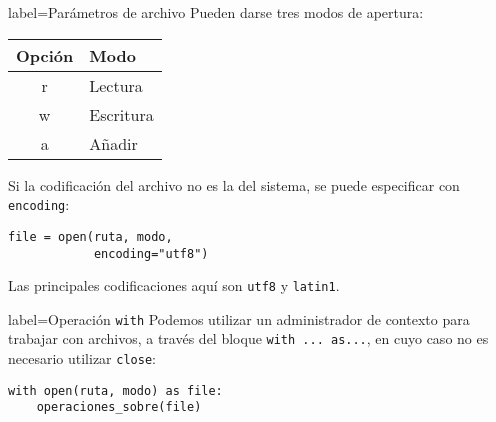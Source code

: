 \begin{contentbox}{label=Parámetros de archivo}
    Pueden darse tres modos de apertura:
    
    \begin{center}
        \begin{tabular}{C|p{0.5\textwidth}}
            \textnormal{Opción} & Modo \\
            \hline
            r & Lectura \\
            w & Escritura \\
            a & Añadir
        \end{tabular}
    \end{center}
    
    Si la codificación del archivo no es la del sistema, se puede especificar con \lstinline!encoding!:
    \begin{lstlisting}
file = open(ruta, modo,
            encoding="utf8")
    \end{lstlisting}
    
    Las principales codificaciones aquí son \lstinline!utf8! y \lstinline!latin1!.
\end{contentbox}
    
\begin{contentbox}{label=Operación \lstinline!with!}
    Podemos utilizar un administrador de contexto para trabajar con archivos, a través del bloque \lstinline!with ... as...!, en cuyo caso no es necesario utilizar \lstinline!close!:
    \begin{lstlisting}
with open(ruta, modo) as file:
    operaciones_sobre(file)
    \end{lstlisting}
\end{contentbox}

